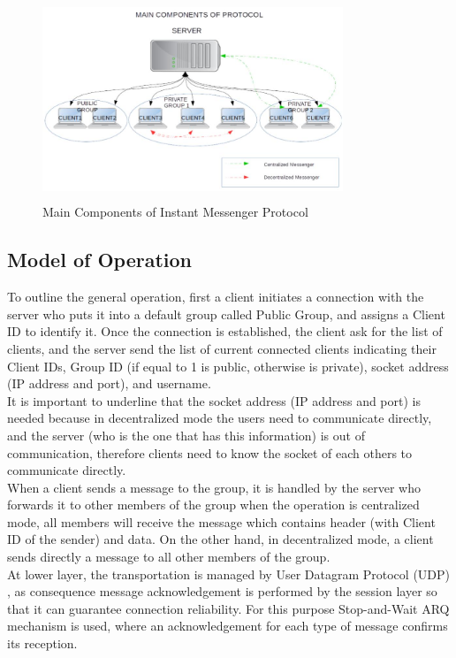 \documentclass{article}
\begin{document}
\begin{figure}[t]
\centering
\includegraphics[width=9cm, height=6cm]{Maincomponents.jpg}
\caption{Main Components of Instant Messenger Protocol}
\label{fig:Maincomponents}
\end{figure}

\subsection{Model of Operation}

To outline the general operation, first a client initiates a connection with the server who puts it into a default group called Public Group, and assigns a Client ID to identify it. Once the connection is established, the client ask for the list of clients, and the server send the list of current connected clients indicating their Client IDs, Group ID (if equal to 1 is public, otherwise is private), socket address (IP address and port), and username.\\

It is important to underline that the socket address (IP address and port) is needed because in decentralized mode the users need to communicate directly, and the server (who is the one that has this information) is out of communication, therefore clients need to know the socket of each others to communicate directly.\\

When a client sends a message to the group, it is handled by the server who forwards it to other members of the group when the operation is centralized mode, all members will receive the message which contains header (with Client ID of the sender) and data. On the other hand, in decentralized mode, a client sends directly a message to all other members of the group.\\

At lower layer, the transportation is managed by User Datagram Protocol (UDP) \cite{3}, as consequence message acknowledgement is performed by the session layer so that it can guarantee connection reliability. For this purpose Stop-and-Wait ARQ mechanism is used, where an acknowledgement for each type of message confirms its reception.\\
\end{document}
